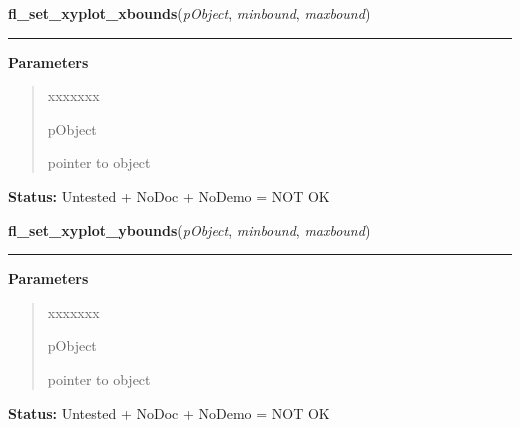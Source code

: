\hspace{.8\funcindent}\begin{boxedminipage}{\funcwidth}

    \raggedright \textbf{fl\_set\_xyplot\_xbounds}(\textit{pObject}, \textit{minbound}, \textit{maxbound})

    \vspace{-1.5ex}

    \rule{\textwidth}{0.5\fboxrule}
\setlength{\parskip}{2ex}
\setlength{\parskip}{1ex}
      \textbf{Parameters}
      \vspace{-1ex}

      \begin{quote}
        \begin{Ventry}{xxxxxxx}

          \item[pObject]

          pointer to object

        \end{Ventry}

      \end{quote}

\textbf{Status:} Untested + NoDoc + NoDemo = NOT OK



    \end{boxedminipage}

    \label{xformslib:library:fl_set_xyplot_ybounds}

    \vspace{0.5ex}

\hspace{.8\funcindent}\begin{boxedminipage}{\funcwidth}

    \raggedright \textbf{fl\_set\_xyplot\_ybounds}(\textit{pObject}, \textit{minbound}, \textit{maxbound})

    \vspace{-1.5ex}

    \rule{\textwidth}{0.5\fboxrule}
\setlength{\parskip}{2ex}
\setlength{\parskip}{1ex}
      \textbf{Parameters}
      \vspace{-1ex}

      \begin{quote}
        \begin{Ventry}{xxxxxxx}

          \item[pObject]

          pointer to object

        \end{Ventry}

      \end{quote}

\textbf{Status:} Untested + NoDoc + NoDemo = NOT OK



    \end{boxedminipage}


